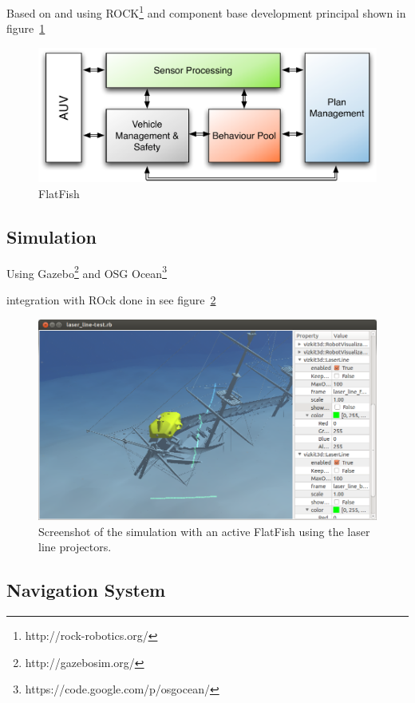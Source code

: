 \documentclass[conference]{IEEEtran}
\begin{document}
Based on \cite{albiez2010} and \cite{meinecke2013} using ROCK\footnote{http://rock-robotics.org/} and component base development \cite{Joyeux2011} principal shown in figure~\ref{fig:sw_arch}

\begin{figure}[!t]
	\centering
	\includegraphics[width=0.9\columnwidth]{sw_arch_overview}
	\caption{FlatFish}
	\label{fig:sw_arch}
\end{figure}


\subsection{Simulation}

Using Gazebo\footnote{http://gazebosim.org/} and OSG Ocean\footnote{https://code.google.com/p/osgocean/}

integration with ROck done in \cite{watanabe2015} see figure~\ref{fig:simulation}

\begin{figure}[!t]
	\centering
	\includegraphics[width=0.9\columnwidth]{flatfish_simulation}
	\caption{Screenshot of the simulation with an active FlatFish using the laser line projectors.}
	\label{fig:simulation}
\end{figure}


\subsection{Navigation System}
\end{document}
